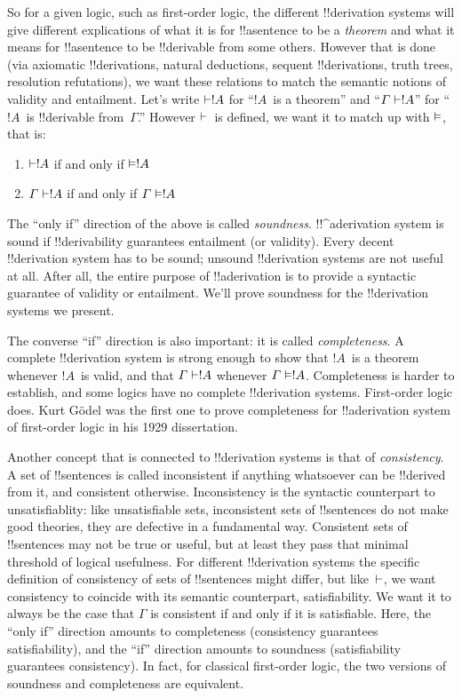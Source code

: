 \documentclass[../../../include/open-logic-section]{subfiles}
\begin{document}
So for a given logic, such as first-order logic, the different
!!{derivation} systems will give different explications of what it is
for !!a{sentence} to be a \emph{theorem} and what it means for
!!a{sentence} to be !!{derivable} from some others. However that is
done (via axiomatic !!{derivation}s, natural deductions, sequent
!!{derivation}s, truth trees, resolution refutations), we want these
relations to match the semantic notions of validity and
entailment. Let's write $\Proves !A$ for ``$!A$~is a theorem'' and
``$\Gamma \Proves !A$'' for ``$!A$~is !!{derivable} from~$\Gamma$.''
However $\Proves$~is defined, we want it to match up with $\Entails$,
that is:
\begin{enumerate}
\item $\Proves !A$ if and only if $\Entails !A$
\item $\Gamma \Proves !A$ if and only if $\Gamma \Entails !A$
\end{enumerate}
The ``only if'' direction of the above is called
\emph{soundness}. !!^a{derivation} system is sound if !!{derivability}
guarantees entailment (or validity). Every decent !!{derivation}
system has to be sound; unsound !!{derivation} systems are not useful
at all. After all, the entire purpose of !!a{derivation} is to provide
a syntactic guarantee of validity or entailment. We'll prove soundness
for the !!{derivation} systems we present.

The converse ``if'' direction is also important: it is called
\emph{completeness}. A complete !!{derivation} system is strong enough
to show that $!A$~is a theorem whenever $!A$~is valid, and that
$\Gamma \Proves !A$ whenever $\Gamma \Entails !A$.
Completeness is harder to establish, and some logics have no complete
!!{derivation} systems. First-order logic does. Kurt G\"odel was the
first one to prove completeness for !!a{derivation} system of
first-order logic in his 1929 dissertation.

Another concept that is connected to !!{derivation} systems is that of
\emph{consistency}. A set of !!{sentence}s is called inconsistent if
anything whatsoever can be !!{derive}d from it, and consistent
otherwise.  Inconsistency is the syntactic counterpart to
unsatisfiablity: like unsatisfiable sets, inconsistent sets of
!!{sentence}s do not make good theories, they are defective in a
fundamental way. Consistent sets of !!{sentence}s may not be true or
useful, but at least they pass that minimal threshold of logical
usefulness.  For different !!{derivation} systems the specific
definition of consistency of sets of !!{sentence}s might differ, but
like~$\Proves$, we want consistency to coincide with its semantic
counterpart, satisfiability. We want it to always be the case that
$\Gamma$ is consistent if and only if it is satisfiable. Here, the
``only if'' direction amounts to completeness (consistency guarantees
satisfiability), and the ``if'' direction amounts to soundness
(satisfiability guarantees consistency).  In fact, for classical
first-order logic, the two versions of soundness and completeness are
equivalent.
\end{document}
